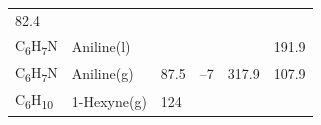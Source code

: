 \documentclass[
]{book}
\theoremstyle{definition}
\theoremstyle{definition}
\theoremstyle{definition}
\theoremstyle{remark}
\begin{document}
\begin{longtable}[]{@{}llllll@{}}
\begin{minipage}[t]{0.14\columnwidth}
82.4\strut
\end{minipage}\tabularnewline
\begin{minipage}[t]{0.07\columnwidth}\raggedright
C\textsubscript{6}H\textsubscript{7}N\strut
\end{minipage} & \begin{minipage}[t]{0.17\columnwidth}\raggedright
Aniline(l)\strut
\end{minipage} & \begin{minipage}[t]{0.15\columnwidth}\raggedright
\strut
\end{minipage} & \begin{minipage}[t]{0.15\columnwidth}\raggedright
\strut
\end{minipage} & \begin{minipage}[t]{0.14\columnwidth}\raggedright
\strut
\end{minipage} & \begin{minipage}[t]{0.14\columnwidth}\raggedright
191.9\strut
\end{minipage}\tabularnewline
\begin{minipage}[t]{0.07\columnwidth}\raggedright
C\textsubscript{6}H\textsubscript{7}N\strut
\end{minipage} & \begin{minipage}[t]{0.17\columnwidth}\raggedright
Aniline(g)\strut
\end{minipage} & \begin{minipage}[t]{0.15\columnwidth}\raggedright
87.5\strut
\end{minipage} & \begin{minipage}[t]{0.15\columnwidth}\raggedright
--7\strut
\end{minipage} & \begin{minipage}[t]{0.14\columnwidth}\raggedright
317.9\strut
\end{minipage} & \begin{minipage}[t]{0.14\columnwidth}\raggedright
107.9\strut
\end{minipage}\tabularnewline
\begin{minipage}[t]{0.07\columnwidth}\raggedright
C\textsubscript{6}H\textsubscript{10}\strut
\end{minipage} & \begin{minipage}[t]{0.17\columnwidth}\raggedright
1-Hexyne(g)\strut
\end{minipage} & \begin{minipage}[t]{0.15\columnwidth}\raggedright
124\strut
\end{minipage} & \begin{minipage}[t]{0.15\columnwidth}\raggedright

\end{minipage}
\end{longtable}
\end{document}
